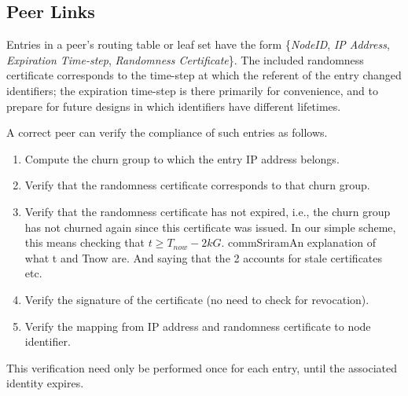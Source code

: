 \subsection{Peer Links}
\label{sec:links}

Entries in a peer's routing table or leaf set have the form 
\{\emph{NodeID}, \emph{IP Address}, \emph{Expiration Time-step},
\emph{Randomness Certificate}\}.  The included randomness certificate
corresponds to the time-step at which the referent of the entry changed
identifiers; the expiration time-step is there primarily for
convenience, and to prepare for future designs in which 
identifiers have different lifetimes.

A correct peer can verify the compliance of such entries as follows.
\begin{enumerate}
\item Compute the churn group to which the entry IP address belongs.
\item Verify that the randomness certificate corresponds to that churn
  group.
\item Verify that the randomness certificate has not expired, i.e.,
  the churn group has not churned again since this certificate was
  issued. In our simple scheme, this means checking that $t \geq
  T_\mathit{now} - 2kG$.   comm{Sriram}{An explanation of what t and Tnow are. And saying that the 2 accounts for stale certificates etc.}

\item Verify the signature of the certificate (no need to check for
  revocation). 
\item Verify the mapping from IP address and randomness certificate to
  node identifier.
\end{enumerate}
This verification need only be performed once for each entry, until the
associated identity expires.



